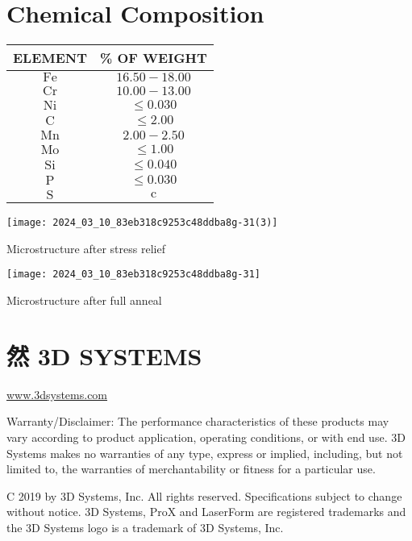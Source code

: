 \documentclass[10pt]{article}
\begin{document}
\section*{Chemical Composition}
\begin{center}
\begin{tabular}{|c|c|}
\hline
ELEMENT & \% OF WEIGHT \\
\hline
$\mathrm{Fe}$ & $16.50-18.00$ \\
$\mathrm{Cr}$ & $10.00-13.00$ \\
$\mathrm{Ni}$ & $\leq 0.030$ \\
$\mathrm{C}$ & $\leq 2.00$ \\
$\mathrm{Mn}$ & $2.00-2.50$ \\
$\mathrm{Mo}$ & $\leq 1.00$ \\
$\mathrm{Si}$ & $\leq 0.040$ \\
$\mathrm{P}$ & $\leq 0.030$ \\
\hline
$\mathrm{S}$ & $\mathrm{c}$ \\
\hline
\end{tabular}
\end{center}

\begin{center}
\texttt{[image: 2024\_03\_10\_83eb318c9253c48ddba8g-31(3)]}
\end{center}

Microstructure after stress relief

\begin{center}
\texttt{[image: 2024\_03\_10\_83eb318c9253c48ddba8g-31]}
\end{center}

Microstructure after full anneal

\section*{然 3D SYSTEMS}
\href{http://www.3dsystems.com}{www.3dsystems.com}

Warranty/Disclaimer: The performance characteristics of these products may vary according to product application, operating conditions, or with end use. 3D Systems makes no warranties of any type, express or implied, including, but not limited to, the warranties of merchantability or fitness for a particular use.

C 2019 by 3D Systems, Inc. All rights reserved. Specifications subject to change without notice. 3D Systems, ProX and LaserForm are registered trademarks and the 3D Systems logo is a trademark of 3D Systems, Inc.
\end{document}
